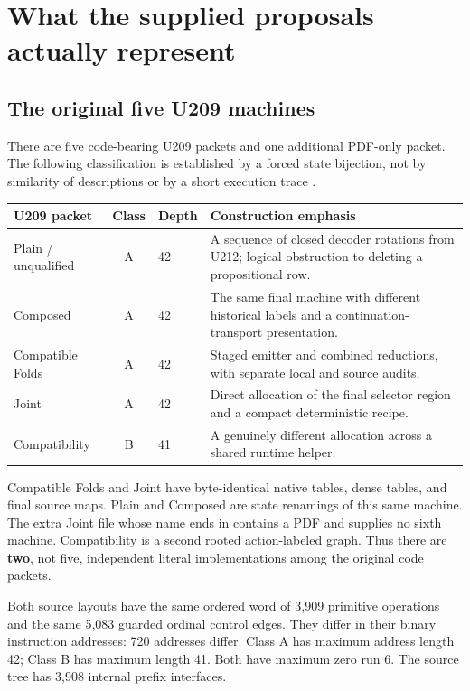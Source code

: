 \documentclass[11pt,a4paper]{article}
\newcommand{\file}[1]{\path{#1}}
\begin{document}
\section{What the supplied proposals actually represent}\label{sec:comparison}

\subsection{The original five U209 machines}

There are five code-bearing U209 packets and one additional PDF-only packet.
The following classification is established by a forced state bijection,
not by similarity of descriptions or by a short execution trace
\cite{original209}.

\begin{center}\small
\begin{tabularx}{\linewidth}{@{}p{30mm}cp{14mm}X@{}}
\toprule
U209 packet & Class & Depth & Construction emphasis\\
\midrule
Plain / unqualified & A & 42 & A sequence of closed decoder rotations from
U212; logical obstruction to deleting a propositional row.\\
Composed & A & 42 & The same final machine with different historical labels
and a continuation-transport presentation.\\
Compatible Folds & A & 42 & Staged emitter and combined reductions, with
separate local and source audits.\\
Joint & A & 42 & Direct allocation of the final selector region and a
compact deterministic recipe.\\
Compatibility & B & 41 & A genuinely different allocation across a shared
runtime helper.\\
\bottomrule
\end{tabularx}
\end{center}

Compatible Folds and Joint have byte-identical native tables, dense tables,
and final source maps. Plain and Composed are state renamings of this same
machine. The extra Joint file whose name ends in \file{(1).zip} contains a
PDF and supplies no sixth machine. Compatibility is a second rooted
action-labeled graph. Thus there are \textbf{two}, not five, independent
literal implementations among the original code packets.

Both source layouts have the same ordered word of 3,909 primitive operations
and the same 5,083 guarded ordinal control edges. They differ in their
binary instruction addresses: 720 addresses differ. Class A has maximum
address length 42; Class B has maximum length 41. Both have maximum zero
run 6. The source tree has 3,908 internal prefix interfaces.
\end{document}
